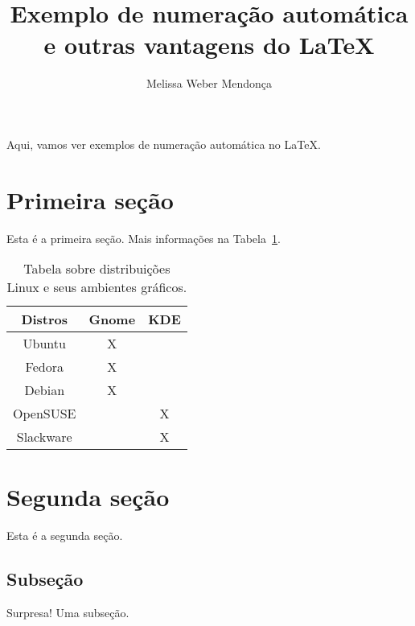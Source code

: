 \documentclass{article}
\author{Melissa Weber Mendonça}
\title{Exemplo de numeração automática\\e outras vantagens do \LaTeX}
\begin{document}
\maketitle


Aqui, vamos ver exemplos de numeração automática no \LaTeX. 

\section{Primeira seção\label{primeira}}

Esta é a primeira seção. Mais informações na Tabela~\ref{tab:distros}.

\begin{table}
   \begin{center}
      \begin{tabular}{|c|c|c|}
        \hline
        Distros & \textbf{Gnome} & \textbf{KDE} \\\hline
        Ubuntu & X & \\\hline
        Fedora & X & \\\hline
        Debian & X & \\\hline
        OpenSUSE & & X \\\hline
        Slackware & & X\\\hline
      \end{tabular}
   \end{center}
   \caption{\label{tab:distros}Tabela sobre distribuições Linux e seus ambientes gráficos.}
\end{table}




\section{Segunda seção}

Esta é a segunda seção.

\subsection{Subseção}

Surpresa! Uma subseção.
\end{document}
